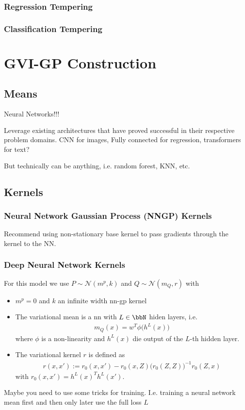 \documentclass{article}
\numberwithin{equation}{section}
\begin{document}
\subsubsection{Regression Tempering}
\subsubsection{Classification Tempering}


\newpage
\section{GVI-GP Construction}\label{section:gvi-gp-construction}
\subsection{Means}
Neural Networks!!!

Leverage existing architectures that have proved successful in their respective problem domains. CNN for images, Fully connected for regression, transformers for text?

But technically can be anything, i.e. random forest, KNN, etc.

\subsection{Kernels}\label{section:kernels}
\subsubsection{Neural Network Gaussian Process (NNGP) Kernels}
Recommend using non-stationary base kernel to pass gradients through the kernel to the NN. 

\subsubsection{Deep Neural Network Kernels}
For this model we use $P \sim \mathcal{N}(m^p, k) $ and $Q \sim \mathcal{N}(m_Q, r)$ with 
\begin{itemize}
    \item $m^p = 0$ and $k$ an infinite width nn-gp kernel
    \item The variational mean is a nn with $L \in \bbN$ hiden layers, i.e. 
    \begin{align}
        m_Q(x) = w^T \phi\big( h^{L}(x) \big)
    \end{align}
    where $\phi$ is a non-linearity and $h^L(x)$ die output of the $L$-th hidden layer. 
    \item 
    The variational kernel $r$ is defined as 
    \begin{align}
        r(x,x') := r_0(x,x') - r_0(x,Z) \big( r_0(Z,Z) \big)^{-1} r_0(Z,x)
    \end{align}
    with $r_0(x,x') = h^{L}(x)^T h^{L}(x')$.
\end{itemize}
Maybe you need to use some tricks for training. I.e. training a neural network mean first and then only later use the full loss $L$
\end{document}
